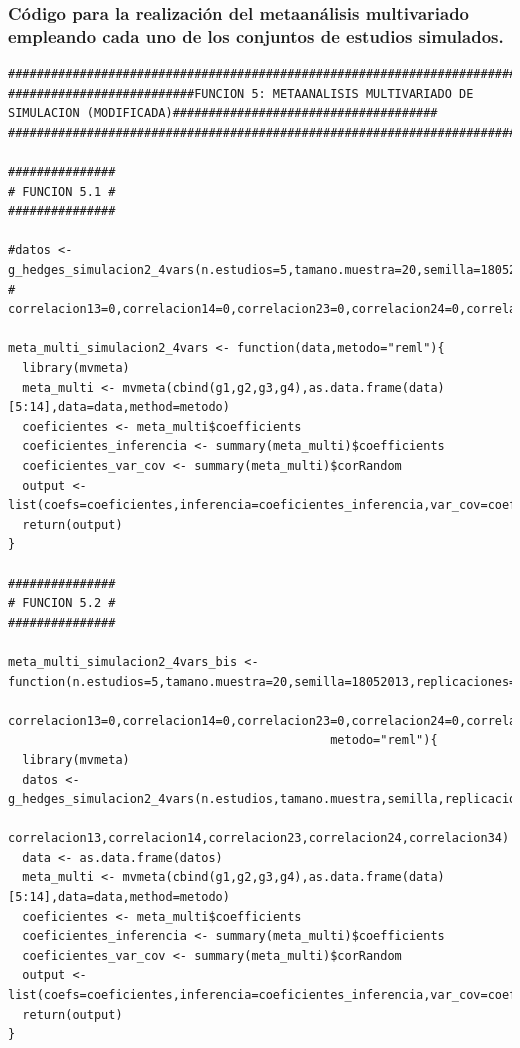 \documentclass[a4paper,openright,12pt]{report}
\begin{document}
\subsubsection{Código para la realización del metaanálisis multivariado empleando cada uno de los conjuntos de estudios simulados.}
{\tiny
\begin{verbatim}
##############################################################################################################################
##########################FUNCION 5: METAANALISIS MULTIVARIADO DE SIMULACION (MODIFICADA)#####################################
##############################################################################################################################

###############
# FUNCION 5.1 #
###############

#datos <- g_hedges_simulacion2_4vars(n.estudios=5,tamano.muestra=20,semilla=18052013,replicaciones=5,correlacion12=0,
#                                    correlacion13=0,correlacion14=0,correlacion23=0,correlacion24=0,correlacion34=0)

meta_multi_simulacion2_4vars <- function(data,metodo="reml"){
  library(mvmeta)
  meta_multi <- mvmeta(cbind(g1,g2,g3,g4),as.data.frame(data)[5:14],data=data,method=metodo)
  coeficientes <- meta_multi$coefficients
  coeficientes_inferencia <- summary(meta_multi)$coefficients
  coeficientes_var_cov <- summary(meta_multi)$corRandom
  output <- list(coefs=coeficientes,inferencia=coeficientes_inferencia,var_cov=coeficientes_var_cov)
  return(output)
}

###############
# FUNCION 5.2 #
###############

meta_multi_simulacion2_4vars_bis <- function(n.estudios=5,tamano.muestra=20,semilla=18052013,replicaciones=5,correlacion12=0,
                                             correlacion13=0,correlacion14=0,correlacion23=0,correlacion24=0,correlacion34=0,
                                             metodo="reml"){
  library(mvmeta)
  datos <- g_hedges_simulacion2_4vars(n.estudios,tamano.muestra,semilla,replicaciones,correlacion12,
                                      correlacion13,correlacion14,correlacion23,correlacion24,correlacion34)
  data <- as.data.frame(datos)
  meta_multi <- mvmeta(cbind(g1,g2,g3,g4),as.data.frame(data)[5:14],data=data,method=metodo)
  coeficientes <- meta_multi$coefficients
  coeficientes_inferencia <- summary(meta_multi)$coefficients
  coeficientes_var_cov <- summary(meta_multi)$corRandom
  output <- list(coefs=coeficientes,inferencia=coeficientes_inferencia,var_cov=coeficientes_var_cov)
  return(output)  
}


\end{verbatim}}
\end{document}
